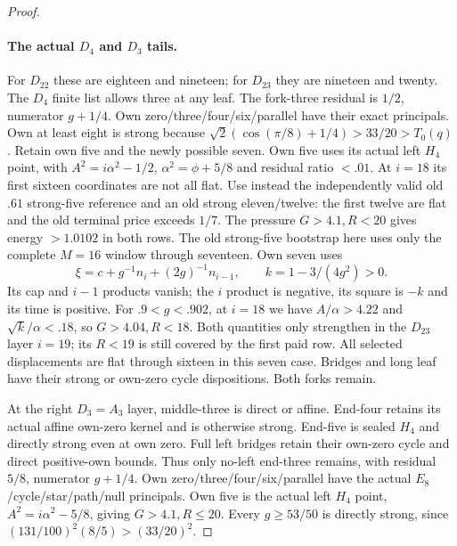 \begin{proof}
\paragraph{The actual $D_4$ and $D_3$ tails.}
For $D_{22}$ these are eighteen and nineteen; for $D_{23}$ they
are nineteen and twenty. The $D_4$ finite list allows three at any
leaf. The fork-three residual is $1/2$, numerator $g+1/4$.
Own zero/three/four/six/parallel have their exact principals.
Own at least eight is strong because
$\sqrt2(\cos(\pi/8)+1/4)>33/20>T_0(q)$.
Retain own five and the newly possible seven. Own five uses its
actual left $H_4$ point, with $A^2=i\alpha^2-1/2$,
$\alpha^2=\phi+5/8$ and residual ratio $<.01$.
At $i=18$ its first sixteen coordinates are not all flat.
Use instead the independently valid old $.61$ strong-five reference
and an old strong eleven/twelve: the first twelve are flat and the
old terminal price exceeds $1/7$. The pressure $G>4.1,R<20$ gives
energy $>1.0102$ in both rows. The old strong-five bootstrap here
uses only the complete $M=16$ window through seventeen.
Own seven uses
\[
 \xi=c+g^{-1}n_i+(2g)^{-1}n_{i-1},\qquad k=1-3/(4g^2)>0.
\]
Its cap and $i-1$ products vanish; the $i$ product is negative,
its square is $-k$ and its time is positive. For $.9<g<.902$,
at $i=18$ we have $A/\alpha>4.22$ and
$\sqrt{k}/\alpha<.18$, so $G>4.04,R<18$. Both quantities
only strengthen in the $D_{23}$ layer $i=19$; its $R<19$ is
still covered by the first paid row. All selected displacements
are flat through sixteen in this seven case. Bridges and long leaf
have their strong or own-zero cycle dispositions. Both forks remain.

At the right $D_3=A_3$ layer, middle-three is direct or affine.
End-four retains its actual affine own-zero kernel and is otherwise
strong. End-five is sealed $H_4$ and directly strong even at own
zero. Full left bridges retain their own-zero cycle and direct
positive-own bounds. Thus only no-left end-three remains, with
residual $5/8$, numerator $g+1/4$. Own zero/three/four/six/parallel
have the actual $E_8$/cycle/star/path/null principals. Own five is
the actual left $H_4$ point, $A^2=i\alpha^2-5/8$, giving
$G>4.1,R\le20$. Every $g\ge53/50$ is directly strong, since
$(131/100)^2(8/5)>(33/20)^2$.


\end{proof}
